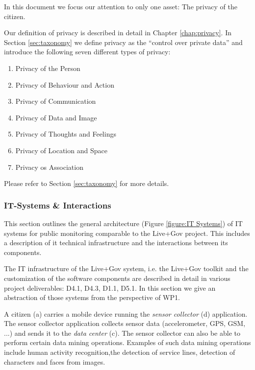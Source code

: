 In this document we focus our attention to only one asset: The privacy of the citizen.

Our definition of privacy is described in detail in Chapter \ref{chap:privacy}. In Section \ref{sec:taxonomy} we define privacy as the ``control over private data'' and introduce the following seven different types of privacy:
\begin{enumerate}
\item Privacy of the Person
\item Privacy of Behaviour and Action
\item Privacy of Communication
\item Privacy of Data and Image
\item Privacy of Thoughts and Feelings
\item Privacy of Location and Space
\item Privacy os Association
\end{enumerate}

Please refer to Section \ref{sec:taxonomy} for more details.

\subsubsection{IT-Systems \& Interactions}
\label{subsubsection:it-systems}

This section outlines the general architecture (Figure \ref{figure:IT Systems}) of IT systems for public monitoring comparable to the Live+Gov project.
This includes a description of it technical infrastructure and the interactions between its components.

The IT infrastructure of the Live+Gov system, i.e. the Live+Gov toolkit and the customization of the software components are described in detail in various project deliverables: D4.1, D4.3, D1.1, D5.1.
In this section we give an abstraction of those systems from the perspective of WP1.



A citizen (a) carries a mobile device running the \emph{sensor collector} (d) application.
The sensor collector application collects sensor data (accelerometer, GPS, GSM, ...) and sends it to the \emph{data center} (c).
The sensor collector can also be able to perform certain data mining operations.
Examples of such data mining operations include human activity recognition,the detection of service lines, detection of characters and faces from images.

